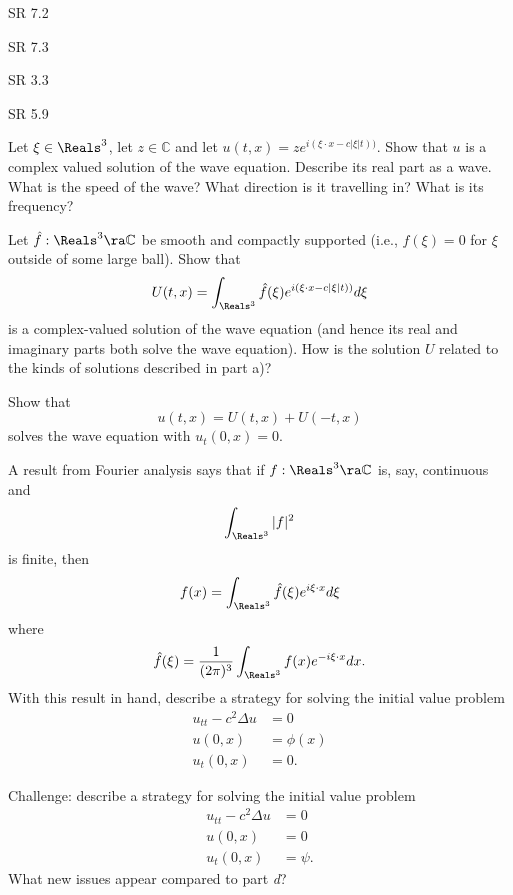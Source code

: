 \documentclass[minion]{homework}
\def\Cplx{\mathbb{C}}
\begin{document}
\begin{aproblems}


\hproblem SR 7.2

\hproblem SR 7.3

\hproblem SR 3.3

\hproblem SR 5.9

\hproblem   
\begin{subproblems}
\item Let $\xi\in\Reals^3$, let $z\in\Cplx$ and let $u(t,x)=ze^{i(\xi\cdot x - c|\xi|t) )}$.
Show that $u$ is a complex valued solution of the wave equation.  Describe its
real part as a wave.  What is the speed of the wave? What direction is it travelling in? What is
its frequency?
\item Let $\hat f:\Reals^3\ra \Cplx$ be smooth and compactly supported (i.e., $f(\xi)=0$ for $\xi$
outside of some large ball). Show that
$$
U(t,x)=\int_{\Reals^3} \hat f(\xi) e^{i(\xi\cdot x - c|\xi|t) )} d\xi
$$
is a complex-valued solution of the wave equation (and hence its real and imaginary parts
both solve the wave equation).  How is the solution $U$ related to the kinds of solutions
described in part a)?
\item
Show that
\begin{equation}
u(t,x) = U(t,x) + U(-t,x)
\end{equation}
solves the wave equation with $u_t(0,x)=0$.
\item A result from Fourier analysis says that if $f:\Reals^3\ra \Cplx$
is, say, continuous and
\begin{equation}
\int_{\Reals^3} |f|^2
\end{equation}
is finite, then
\begin{equation}
f(x) =  \int_{\Reals^3} \hat f(\xi) e^{i\xi\cdot x } d\xi
\end{equation}
where
\begin{equation}
\hat f(\xi) = \frac{1}{(2\pi)^3} \int_{\Reals^3} f(x) e^{-i\xi\cdot x } dx.
\end{equation}
With this result in hand, describe a strategy for solving the initial value problem
\begin{align*}
u_{tt}-c^2\Delta u &= 0\\
u(0,x) &= \phi(x)\\
u_t(0,x) &= 0.
\end{align*}
\item Challenge: describe a strategy for solving the initial value problem
\begin{align*}
u_{tt}-c^2\Delta u &= 0\\
u(0,x) &= 0\\
u_t(0,x) &= \psi.
\end{align*}
What new issues appear compared to part \emph{d}?
\end{subproblems}


\end{aproblems}
\end{document}
